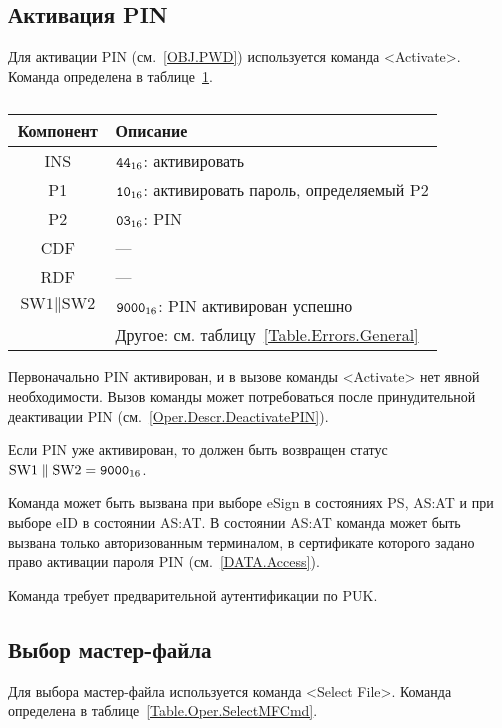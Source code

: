\subsection{Активация PIN}\label{Oper.Descr.ActivatePIN}

Для активации PIN (см.~\ref{OBJ.PWD})  используется команда <Activate>.
Команда определена в таблице~\ref{Table.Oper.ActivatePINCmd}.

\begin{table}[hbt]
\caption{}\label{Table.Oper.ActivatePINCmd}
\begin{tabular}{|c|p{14cm}|}
\hline
Компонент & Описание\\
\hline
\hline
INS & $\texttt{44}_{16}$: активировать\\
\hline
P1 & $\texttt{10}_{16}$: активировать пароль, определяемый P2\\
\hline
P2 & $\texttt{03}_{16}$: PIN \\
\hline
CDF &  ---  \\
\hline 
RDF &  --- \\
\hline
$\text{SW1} \parallel \text{SW2}$ & 
  $\texttt{9000}_{16}$:  PIN активирован успешно\\
\cline{2-2}
  & Другое: см. таблицу~\ref{Table.Errors.General}\\
\hline
\end{tabular}
\end{table}

Первоначально PIN активирован, и в вызове команды <Activate> 
нет явной необходимости. Вызов команды может потребоваться после 
принудительной деактивации PIN (см.~\ref{Oper.Descr.DeactivatePIN}). 

Если PIN уже активирован, то должен быть возвращен 
статус $\text{SW1} \parallel \text{SW2} = \texttt{9000}_{16}$.

Команда может быть вызвана при выборе eSign 
в состояниях PS, AS:AT и при выборе eID в состоянии 
AS:AT. В состоянии AS:AT команда может быть вызвана 
только авторизованным терминалом, в сертификате которого задано 
право активации пароля PIN (см.~\ref{DATA.Access}).

Команда требует предварительной аутентификации по PUK.

\subsection{Выбор мастер-файла}
\label{Oper.Descr.SelectMF}

Для выбора мастер-файла используется команда <Select File>. Команда определена в  
таблице~\ref{Table.Oper.SelectMFCmd}. 

